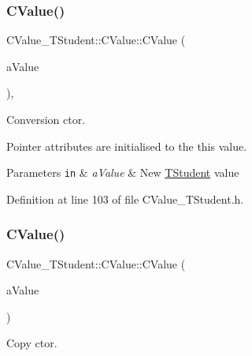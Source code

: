 \subsubsection{\texorpdfstring{C\+Value()}{CValue()}\hspace{0.1cm}{\footnotesize\ttfamily [2/4]}}
{\footnotesize\ttfamily C\+Value\+\_\+\+T\+Student\+::\+C\+Value\+::\+C\+Value (\begin{DoxyParamCaption}\item[{const \hyperlink{struct_c_value___t_student_1_1_t_student}{T\+Student}}]{a\+Value }\end{DoxyParamCaption})\hspace{0.3cm}{\ttfamily [inline]}, {\ttfamily [explicit]}}



Conversion c\textquotesingle{}tor. 

Pointer attributes are initialised to the {\ttfamily this} value. 
\begin{DoxyParams}[1]{Parameters}
\mbox{\tt in}  & {\em a\+Value} & New \hyperlink{struct_c_value___t_student_1_1_t_student}{T\+Student} value \\
\hline
\end{DoxyParams}


Definition at line 103 of file C\+Value\+\_\+\+T\+Student.\+h.

\mbox{\label{class_c_value___t_student_1_1_c_value_a093fe369a13652f089a92884b60e0cfa}} 
\subsubsection{\texorpdfstring{C\+Value()}{CValue()}\hspace{0.1cm}{\footnotesize\ttfamily [3/4]}}
{\footnotesize\ttfamily C\+Value\+\_\+\+T\+Student\+::\+C\+Value\+::\+C\+Value (\begin{DoxyParamCaption}\item[{const \hyperlink{class_c_value___t_student_1_1_c_value}{C\+Value} \&}]{a\+Value }\end{DoxyParamCaption})\hspace{0.3cm}{\ttfamily [inline]}}



Copy c\textquotesingle{}tor. 

